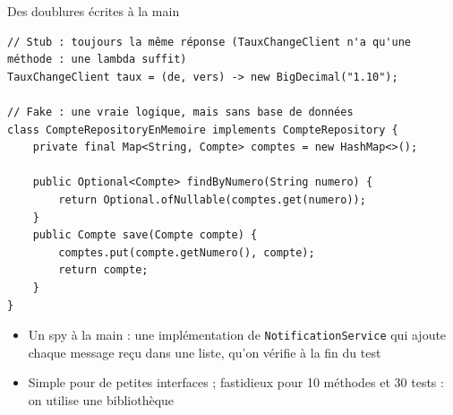 \documentclass[aspectratio=169,10pt]{beamer}
\begin{document}
\begin{frame}[fragile]{Des doublures écrites à la main}
\begin{lstlisting}[basicstyle=\lstcode\scriptsize]
// Stub : toujours la même réponse (TauxChangeClient n'a qu'une méthode : une lambda suffit)
TauxChangeClient taux = (de, vers) -> new BigDecimal("1.10");

// Fake : une vraie logique, mais sans base de données
class CompteRepositoryEnMemoire implements CompteRepository {
    private final Map<String, Compte> comptes = new HashMap<>();

    public Optional<Compte> findByNumero(String numero) {
        return Optional.ofNullable(comptes.get(numero));
    }
    public Compte save(Compte compte) {
        comptes.put(compte.getNumero(), compte);
        return compte;
    }
}
\end{lstlisting}
  \small
  \begin{itemize}
    \item Un spy à la main : une implémentation de \texttt{NotificationService} qui ajoute chaque message reçu dans une liste, qu'on vérifie à la fin du test
    \item Simple pour de petites interfaces ; fastidieux pour 10 méthodes et 30 tests : on utilise une bibliothèque
  \end{itemize}
\end{frame}

\end{document}
